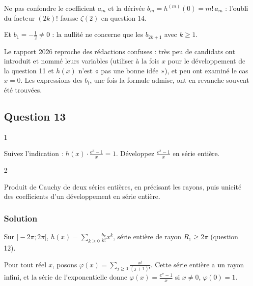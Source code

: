 \documentclass[11pt,a4paper]{article}
\begin{document}
\begin{piege}

Ne pas confondre le coefficient \(a_m\) et la dérivée \(b_m=h^{(m)}(0)=m!\,a_m\) : l'oubli du facteur \((2k)!\) fausse \(\zeta(2)\) en question 14.

Et \(b_1=-\frac12\ne0\) : la nullité ne concerne que les \(b_{2k+1}\) avec \(k\ge1\).

\end{piege}

\begin{jury}

Le rapport 2026 reproche des rédactions confuses : très peu de candidats ont introduit et nommé leurs variables (utiliser à la fois \(x\) pour le développement de la question 11 et \(h(x)\) n'est « pas une bonne idée »), et peu ont examiné le cas \(x=0\). Les expressions des \(b_i\), une fois la formule admise, ont en revanche souvent été trouvées.

\end{jury}

\hypertarget{question-13}{%
\subsection{Question 13}\label{question-13}}

\begin{indication}{1}

Suivez l'indication : \(h(x)\cdot\frac{e^x-1}{x}=1\). Développez \(\frac{e^x-1}{x}\) en série entière.

\end{indication}

\begin{indication}{2}

Produit de Cauchy de deux séries entières, en précisant les rayons, puis unicité des coefficients d'un développement en série entière.

\end{indication}

\hypertarget{solution-12}{%
\subsubsection{Solution}\label{solution-12}}

Sur \(]-2\pi;2\pi[\), \(h(x)=\sum_{k\ge0}\frac{b_k}{k!}x^k\), série entière de rayon \(R_1\ge2\pi\) (question 12).

Pour tout réel \(x\), posons \(\varphi(x)=\sum_{j\ge0}\frac{x^j}{(j+1)!}\). Cette série entière a un rayon infini, et la série de l'exponentielle donne \(\varphi(x)=\frac{e^x-1}{x}\) si \(x\ne0\), \(\varphi(0)=1\).
\end{document}
